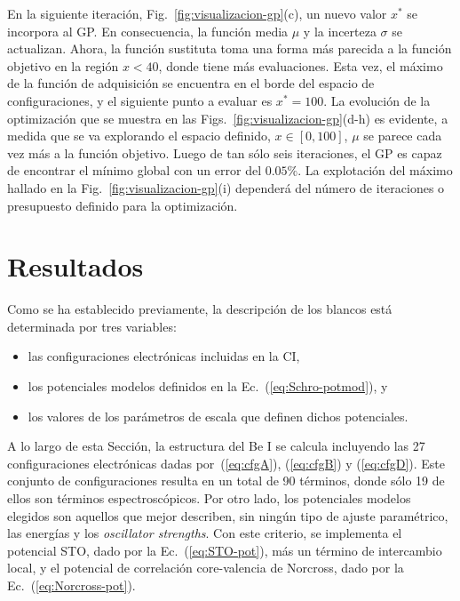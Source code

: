 En la siguiente iteración, Fig.~\ref{fig:visualizacion-gp}(c), un nuevo 
valor $x^*$ se incorpora al GP. En consecuencia, la función media $\mu$ 
y la incerteza $\sigma$ se actualizan. Ahora, la función sustituta toma
una forma más parecida a la función objetivo en la región $x<40$, donde 
tiene más evaluaciones. Esta vez, el máximo de la función de adquisición
se encuentra en el borde del espacio de configuraciones, y el siguiente 
punto a evaluar es $x^*=100$. La evolución de la optimización que se 
muestra en las Figs.~\ref{fig:visualizacion-gp}(d-h) es evidente, a 
medida que se va explorando el espacio definido, $x\in[0,100]$, $\mu$ se 
parece cada vez más a la función objetivo. Luego de tan sólo seis 
iteraciones, el GP es capaz de encontrar el mínimo global con un error 
del $0.05\%$. La explotación del máximo hallado en la 
Fig.~\ref{fig:visualizacion-gp}(i) dependerá del número de iteraciones 
o presupuesto definido para la optimización. 

\section{Resultados}
\label{sec:results-rmatrix}

Como se ha establecido previamente, la descripción de los blancos está 
determinada por tres variables:
\begin{itemize}
\item las configuraciones electrónicas incluidas en la CI,
\item los potenciales modelos definidos en la 
Ec.~(\ref{eq:Schro-potmod}), y 
\item los valores de los parámetros de escala que definen dichos 
potenciales.
\end{itemize}
A lo largo de esta Sección, la estructura del Be I se calcula incluyendo
las 27 configuraciones electrónicas dadas por~(\ref{eq:cfgA}), 
(\ref{eq:cfgB}) y (\ref{eq:cfgD}). Este conjunto de configuraciones 
resulta en un total de 90 términos, donde sólo 19 de ellos son términos 
espectroscópicos. Por otro lado, los potenciales modelos elegidos son 
aquellos que mejor describen, sin ningún tipo de ajuste paramétrico, las 
energías y los \textit{oscillator strengths}. Con este criterio, se 
implementa el potencial STO, dado por la Ec.~(\ref{eq:STO-pot}), más un 
término de intercambio local, y el potencial de correlación 
core-valencia de Norcross, dado por la Ec.~(\ref{eq:Norcross-pot}).

